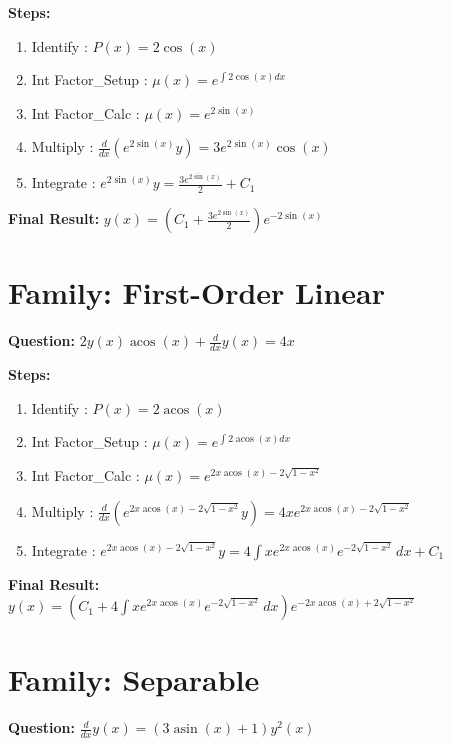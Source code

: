 \documentclass{article}
\begin{document}
\textbf{Steps:}
\begin{enumerate}
\item Identify :  $P(x) = 2 \cos{\left(x \right)}$
\item Int Factor_Setup :  $\mu(x) = e^{\int 2 \cos{\left(x \right)} dx}$
\item Int Factor_Calc :  $\mu(x) = e^{2 \sin{\left(x \right)}}$
\item Multiply :  $\frac{d}{dx}(e^{2 \sin{\left(x \right)}}y) = 3 e^{2 \sin{\left(x \right)}} \cos{\left(x \right)}$
\item Integrate :  $e^{2 \sin{\left(x \right)}}y = \frac{3 e^{2 \sin{\left(x \right)}}}{2} + C_1$
\end{enumerate}
\textbf{Final Result:} $y{\left(x \right)} = \left(C_{1} + \frac{3 e^{2 \sin{\left(x \right)}}}{2}\right) e^{- 2 \sin{\left(x \right)}}$

\section*{Family: First-Order Linear}
\textbf{Question:} $2 y{\left(x \right)} \operatorname{acos}{\left(x \right)} + \frac{d}{d x} y{\left(x \right)} = 4 x$

\textbf{Steps:}
\begin{enumerate}
\item Identify :  $P(x) = 2 \operatorname{acos}{\left(x \right)}$
\item Int Factor_Setup :  $\mu(x) = e^{\int 2 \operatorname{acos}{\left(x \right)} dx}$
\item Int Factor_Calc :  $\mu(x) = e^{2 x \operatorname{acos}{\left(x \right)} - 2 \sqrt{1 - x^{2}}}$
\item Multiply :  $\frac{d}{dx}(e^{2 x \operatorname{acos}{\left(x \right)} - 2 \sqrt{1 - x^{2}}}y) = 4 x e^{2 x \operatorname{acos}{\left(x \right)} - 2 \sqrt{1 - x^{2}}}$
\item Integrate :  $e^{2 x \operatorname{acos}{\left(x \right)} - 2 \sqrt{1 - x^{2}}}y = 4 \int x e^{2 x \operatorname{acos}{\left(x \right)}} e^{- 2 \sqrt{1 - x^{2}}}\, dx + C_1$
\end{enumerate}
\textbf{Final Result:} $y{\left(x \right)} = \left(C_{1} + 4 \int x e^{2 x \operatorname{acos}{\left(x \right)}} e^{- 2 \sqrt{1 - x^{2}}}\, dx\right) e^{- 2 x \operatorname{acos}{\left(x \right)} + 2 \sqrt{1 - x^{2}}}$

\section*{Family: Separable}
\textbf{Question:} $\frac{d}{d x} y{\left(x \right)} = \left(3 \operatorname{asin}{\left(x \right)} + 1\right) y^{2}{\left(x \right)}$
\end{document}
